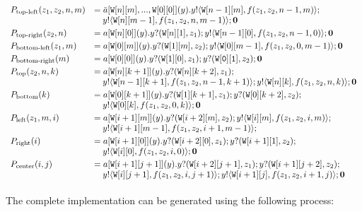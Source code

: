 \documentclass{LMCS}
\newcommand{\sr}[4]{\ensuremath{\bar{#1}[#2](#3).#4}}
\newcommand{\ssa}[4]{\ensuremath{#1[#2](#3).#4}}
\newcommand{\participant}[1]{\ensuremath{\mathtt{#1}}}
\newcommand{\inact}{\ensuremath{\mathbf{0}}}
\newcommand{\outS}[3]{\ensuremath{#1!\langle #2\rangle;#3}}
\newcommand{\inpS}[3]{\ensuremath{#1?( #2);#3}}
\newcommand{\y}{\ensuremath{y}}
\newcommand{\ii}{\ensuremath{i}}
\newcommand{\jj}{\ensuremath{j}}
\newcommand{\kk}{\ensuremath{k}}
\newcommand{\nn}{\ensuremath{n}}
\newcommand{\mm}{\ensuremath{m}}
\newcommand{\PP}{\ensuremath{P}}
\newcommand{\W}{\ensuremath{\mathtt{W}}}
\begin{document}
{\small
$\begin{array}{ll}
\PP_{\text{top-left}}(z_1,z_2,\nn, \mm)  & =  \sr{a}{\W[\nn][\mm], ..., \W[0][0]}{y}{
\outS{y}{\W[n-1][m], f(z_1,z_2,n-1,m)}}\\
 & ~~~\outS{y}{\W[n][m-1], f(z_1,z_2,n,m-1)}{\inact}\\[1mm]
\PP_{\text{top-right}}(z_2,\nn) & = \ssa{a}{\W[n][0]}{y}{\inpS{y}{\W[n][1], z_1}\outS{y}{\W[n-1][0], f(z_1,z_2,n-1,0)}\inact}\\[1mm]
\PP_{\text{bottom-left}}(z_1,\mm) & =  \ssa{a}{\W[0][m]}{y}{\inpS{y}{\W[1][m], z_2}\outS{y}{\W[0][m-1], f(z_1,z_2,0,m-1)}\inact}\\[1mm]
\PP_{\text{bottom-right}}(\mm) & =   \ssa{a}{\W[0][0]}{y}{\inpS{y}{\W[1][0], z_1}\inpS{y}{\participant{\W[0][1]}, z_2}\inact}\\[1mm]
\PP_{\text{top}}(z_2,\nn, \kk) & = 
\ssa{a}{\W[n][k+1]}{y}{\inpS{y}{\W[n][k+2], z_1}}\\
 & ~~~ \outS{y}{\W[n-1][k+1], f(z_1,z_2,n-1,k+1)}\outS{y}{{\W[n][k]}, f(z_1,z_2,n,k)}\inact\\[1mm] 
\PP_{\text{bottom}}(\kk) & = \ssa{a}{\W[0][k+1]}{y}{\inpS{y}{\W[1][k+1], z_1}\inpS{y}{\W[0][k+2], z_2}}\\
& ~~~ \outS{y}{\W[0][k], f(z_1,z_2,0,k)}\inact\\[1mm]
\PP_{\text{left}}(z_1,\mm, \ii) & = \ssa{a}{\W[i+1][m]}{y}{\inpS{y}{{\W[i+2][m]}, z_2}\outS{y}{{\W[i][m]}, f(z_1,z_2,i,m)}}\\
& ~~~ \outS{y}{{\W[i+1][m-1]}, f(z_1,z_2,i+1,m-1)}\\[1mm] 
\PP_{\text{right}}(\ii) & =  \ssa{a}{\W[i+1][0]}{y}{\inpS{y}{{\W[i+2][0]}, z_1}\inpS{y}{{\W[i+1][1]}, z_2}}\\
& ~~~ \outS{y}{{\W[i][0]}, f(z_1,z_2,i,0)}\inact\\[1mm]
\PP_{\text{center}}(\ii, \jj) & = \ssa{a}{\W[i+1][j+1]}{y}{\inpS{\y}{\W[i+2][j+1], z_1} \inpS{\y}{\W[i+1][j+2], z_2}}\\
 &~~~ \outS{y}{\W[i][j+1], f(z_1,z_2,i,j+1)}\outS{y}{\W[i+1][j], f(z_1,z_2,i+1,j)}\inact\\[1mm]
\end{array}$
}

The complete implementation can be generated using the following process:
\end{document}
